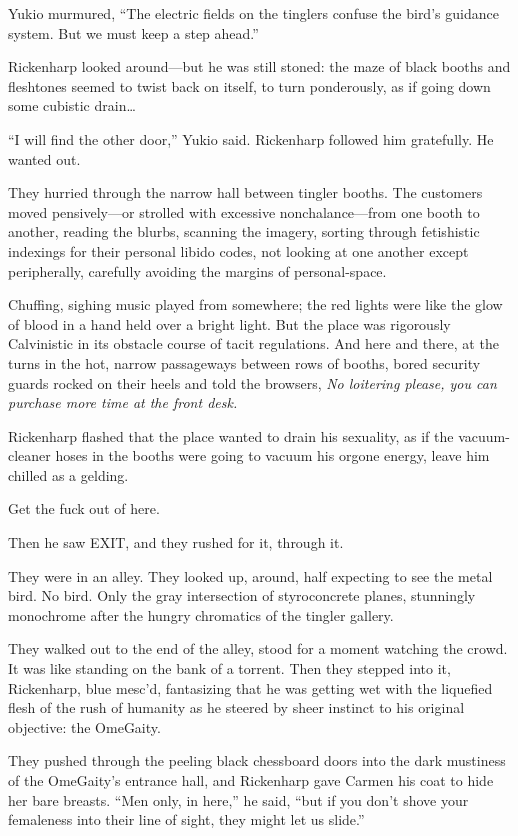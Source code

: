 Yukio murmured, ``The electric fields on the tinglers confuse the bird's guidance system. But we must keep a step ahead.''

Rickenharp looked around---but he was still stoned: the maze of black booths and fleshtones seemed to twist back on itself, to turn ponderously, as if going down some cubistic drain\ldots

``I will find the other door,'' Yukio said. Rickenharp followed him gratefully. He wanted out.

They hurried through the narrow hall between tingler booths. The customers moved pensively---or strolled with excessive nonchalance---from one booth to another, reading the blurbs, scanning the imagery, sorting through fetishistic indexings for their personal libido codes, not looking at one another except peripherally, carefully avoiding the margins of personal-space.

Chuffing, sighing music played from somewhere; the red lights were like the glow of blood in a hand held over a bright light. But the place was rigorously Calvinistic in its obstacle course of tacit regulations. And here and there, at the turns in the hot, narrow passageways between rows of booths, bored security guards rocked on their heels and told the browsers, \textit{No loitering please, you can purchase more time at the front desk.}

Rickenharp flashed that the place wanted to drain his sexuality, as if the vacuum-cleaner hoses in the booths were going to vacuum his orgone energy, leave him chilled as a gelding.

Get the fuck out of here.

Then he saw EXIT, and they rushed for it, through it.

They were in an alley. They looked up, around, half expecting to see the metal bird. No bird. Only the gray intersection of styroconcrete planes, stunningly monochrome after the hungry chromatics of the tingler gallery.

They walked out to the end of the alley, stood for a moment watching the crowd. It was like standing on the bank of a torrent. Then they stepped into it, Rickenharp, blue mesc'd, fantasizing that he was getting wet with the liquefied flesh of the rush of humanity as he steered by sheer instinct to his original objective: the OmeGaity.

They pushed through the peeling black chessboard doors into the dark mustiness of the OmeGaity's entrance hall, and Rickenharp gave Carmen his coat to hide her bare breasts. ``Men only, in here,'' he said, ``but if you don't shove your femaleness into their line of sight, they might let us slide.''

